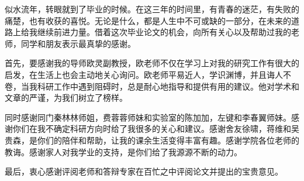 \begin{acknowledgements}
似水流年，转眼就到了毕业的时候。在这三年的时间里，有青春的迷茫，有失败的痛楚，也有收获的喜悦。无论是什么，都是人生中不可或缺的一部分，在未来的道路上给我继续前进力量。借着这次毕业论文的机会，向所有关心以及帮助过我的老师，同学和朋友表示最真挚的感谢。

首先，要感谢我的导师欧灵副教授，欧老师不仅在学习上对我的研究工作有很大的启发，在生活上也会主动地关心询问。欧老师平易近人，学识渊博，并且诲人不卷，当我科研工作中遇到阻碍时，总是耐心地指导和提供有用的建议。他对学术和文章的严谨，为我们树立了榜样。

同时感谢同门秦林林师姐，费蓉蓉师妹和实验室的陈加加，左键和李春翼师妹。感谢你们在我不确定科研方向时给了我很多的关心和建议。感谢舍友徐啸，蒋维和吴贵森，是你们的陪伴和帮助，让我的课余生活变得丰富有趣。感谢学院各位老师的教诲。感谢家人对我学业的支持，是你们给了我源源不断的动力。

最后，衷心感谢评阅老师和答辩专家在百忙之中评阅论文并提出的宝贵意见。
\end{acknowledgements}
